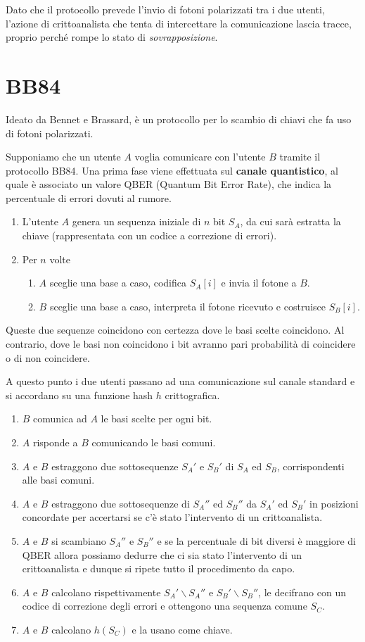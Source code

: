 Dato che il protocollo prevede l'invio di fotoni polarizzati tra i due utenti, l'azione di crittoanalista che tenta di
intercettare la comunicazione lascia tracce, proprio perch\'e rompe lo stato di \emph{sovrapposizione}.

\section{BB84}
Ideato da Bennet e Brassard, \`e un protocollo per lo scambio di chiavi che fa uso di fotoni polarizzati.

Supponiamo che un utente $A$ voglia comunicare con l'utente $B$ tramite il protocollo BB84. Una prima fase viene
effettuata sul \textbf{canale quantistico}, al quale \`e associato un valore QBER (Quantum Bit Error Rate), che indica
la percentuale di errori dovuti al rumore.
\begin{enumerate}
	\item L'utente $A$ genera un sequenza iniziale di $n$ bit $S_A$, da cui sar\`a estratta la chiave (rappresentata
	      con un codice a correzione di errori).
	\item Per $n$ volte
	      \begin{enumerate}[label=(\Roman*)]
		      \item $A$ sceglie una base a caso, codifica $S_A[i]$ e invia il fotone a $B$.
		      \item $B$ sceglie una base a caso, interpreta il fotone ricevuto e costruisce $S_B[i]$.
	      \end{enumerate}
\end{enumerate}
Queste due sequenze coincidono con certezza dove le basi scelte coincidono. Al contrario, dove le basi non coincidono
i bit avranno pari probabilit\`a di coincidere o di non coincidere.

A questo punto i due utenti passano ad una comunicazione sul canale standard e si accordano su una funzione hash $h$
crittografica.
\begin{enumerate}
	\item $B$ comunica ad $A$ le basi scelte per ogni bit.
	\item $A$ risponde a $B$ comunicando le basi comuni.
	\item $A$ e $B$ estraggono due sottosequenze $S_A'$ e $S_B'$ di $S_A$ ed $S_B$, corrispondenti alle basi comuni.
	\item $A$ e $B$ estraggono due sottosequenze di $S_A''$ ed $S_B''$ da $S_A'$ ed $S_B'$ in posizioni concordate per
	      accertarsi se c'\`e stato l'intervento di un crittoanalista.
	\item $A$ e $B$ si scambiano $S_A''$ e $S_B''$ e se la percentuale di bit diversi \`e maggiore di QBER allora
	      possiamo dedurre che ci sia stato l'intervento di un crittoanalista e dunque si ripete tutto il procedimento
	      da capo.
	\item $A$ e $B$ calcolano rispettivamente $S_A' \backslash S_A''$ e $S_B' \backslash S_B''$, le decifrano con un
	      codice di correzione degli errori e ottengono una sequenza comune $S_C$.
	\item $A$ e $B$ calcolano $h(S_C)$ e la usano come chiave.
\end{enumerate}

